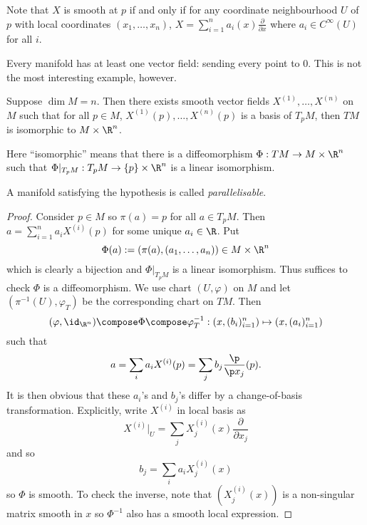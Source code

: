 \documentclass[a4paper]{article}
\begin{document}
Note that \(X\) is smooth at \(p\) if and only if for any coordinate neighbourhood \(U\) of \(p\) with local coordinates \((x_1, \dots, x_n)\), \(X = \sum_{i = 1}^n a_i(x) \frac{\partial  }{\partial x}\) where \(a_i \in C^\infty(U)\) for all \(i\).

\begin{eg}
  Every manifold has at least one vector field: sending every point to \(0\). This is not the most interesting example, however.
\end{eg}

\begin{theorem}
  Suppose \(\dim M = n\). Then there exists smooth vector fields \(X^{(1)}, \dots, X^{(n)}\) on \(M\) such that for all \(p \in M\), \(X^{(1)}(p), \dots, X^{(n)}(p)\) is a basis of \(T_pM\), then \(TM\) is isomorphic to \(M \times \R^n\).
\end{theorem}

Here ``isomorphic'' means that there is a diffeomorphism \(\Phi: TM \to M \times \R^n\) such that \(\Phi|_{T_pM}: T_pM \to \{p\} \times \R^n\) is a linear isomorphism.

\begin{definition}[parallelisable]
  A manifold satisfying the hypothesis is called \emph{parallelisable}.
\end{definition}

\begin{proof}
  Consider \(p \in M\) so \(\pi(a) = p\) for all \(a \in T_pM\). Then \(a = \sum_{i = 1}^n a_iX^{(i)}(p)\) for some unique \(a_i \in \R\). Put
  \[
    \Phi(a) := (\pi(a), (a_1, \dots, a_n)) \in M \times \R^n
  \]
  which is clearly a bijection and \(\Phi|_{T_pM}\) is a linear isomorphism. Thus suffices to check \(\Phi\) is a diffeomorphism. We use chart \((U, \varphi)\) on \(M\) and let \((\pi^{-1}(U), \varphi_T)\) be the corresponding chart on \(TM\). Then
  \[
    (\varphi, \id_{\R^n}) \compose \Phi \compose \varphi_T^{-1}:
    (x, (b_i)_{i = 1}^n) \mapsto (x, (a_i)_{i = 1}^n)
  \]
  such that
  \[
    a = \sum_i a_i X^{(i)}(p) = \sum_j b_j \frac{\p}{\p x_j}(p).
  \]
  It is then obvious that these \(a_i\)'s and \(b_j\)'s differ by a change-of-basis transformation. Explicitly, write \(X^{(i)}\) in local basis as
  \[
    X^{(i)}|_U = \sum_j X_j^{(i)} (x) \frac{\partial  }{\partial x_j}
  \]
  and so
  \[
    b_j = \sum_i a_i X_j^{(i)}(x)
  \]
  so \(\Phi\) is smooth. To check the inverse, note that \((X_j^{(i)}(x))\) is a non-singular matrix smooth in \(x\) so \(\Phi^{-1}\) also has a smooth local expression.
\end{proof}
\end{document}

